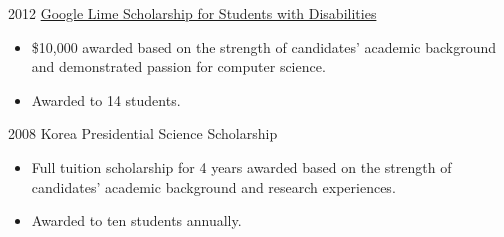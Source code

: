 \documentclass[]{patyoon-cv}
\begin{document}
\begin{entrylist}
  \entry
  {2012}
  {\href{http://www.limeconnect.com/opportunities/page/google-lime-scholarship-program}
    {Google Lime Scholarship for Students with Disabilities}}
  {
    \begin{itemize}
    \item \$10,000 awarded based on the strength of candidates' academic background and demonstrated passion for computer science.
    \item Awarded to 14 students.
    \end{itemize}}
  \entry
  {2008}
  {Korea Presidential Science Scholarship}
  {
    \begin{itemize}
    \item Full tuition scholarship for 4 years awarded based on the strength of candidates' academic background and research experiences.
    \item Awarded to ten students annually.
    \end{itemize}
  }
\end{entrylist}
\end{document}
